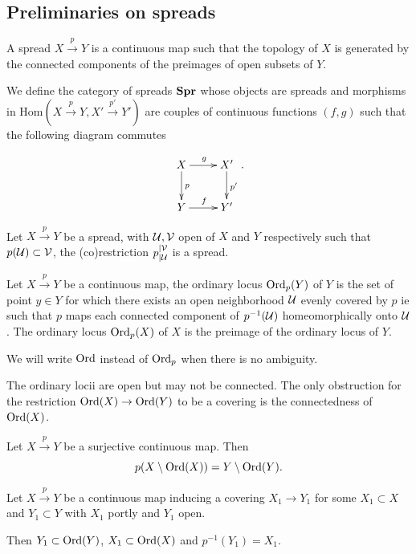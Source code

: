 \subsection{Preliminaries on spreads}\label{sec:spread_base}


\begin{defi} A spread $X\xrightarrow{p} Y$ is a continuous map such that the topology of $X$ is generated by the connected components of the preimages of open subsets of $Y$.

We define the category of spreads $\mathbf{Spr}$ whose objects are spreads and morphisms in $\mathrm{Hom}(X\xrightarrow{p} Y, X'\xrightarrow{p'} Y')$ are couples of continuous functions $(f,g)$  such that the following diagram commutes

$$\xymatrix{
X\ar[d]^p \ar[r]^g & X' \ar[d]^{p'} \\ Y \ar[r]^{f} & Y'
}.$$

\end{defi}

\begin{rem} Let $X\xrightarrow{p} Y$ be a spread, 
with $\mathcal{U},\mathcal V$ open of $X$  and $Y$ respectively such that $p(\mathcal{U})\subset \mathcal V$, the (co)restriction $p_{|\mathcal{U}}^{|\mathcal V}$ is a spread.
\end{rem}
\begin{defi}
  Let $X\xrightarrow{p} Y$ be a continuous map, the  ordinary locus $\mathrm{Ord}_p(Y)$ of $Y$  is the set of point $y\in Y$  for which there exists an open neighborhood $\mathcal{U}$ evenly covered by $p$ ie such that $p$ maps each connected component of $p^{-1}(\mathcal{U})$ homeomorphically onto $\mathcal{U}$. The ordinary locus $\mathrm{Ord}_p(X)$ of $X$ is the preimage of the ordinary locus of $Y$.
  
  We will write $\mathrm{Ord}$ instead of $\mathrm{Ord}_p$ when there is no ambiguity.
\end{defi}
\begin{rem}
 The ordinary locii are open but may not be connected. The only obstruction for the restriction $\mathrm{Ord}(X)\rightarrow \mathrm{Ord}(Y)$ to be a covering is the connectedness of $\mathrm{Ord}(X)$.
\end{rem}
\begin{rem}\label{rem:singular_on_singular}
 Let $X\xrightarrow{p}Y$ be a surjective continuous map. Then $$p(X\setminus \mathrm{Ord}(X))  = Y\setminus \mathrm{Ord}(Y).$$
\end{rem}


\begin{lem}\label{lem:spread_partial_covering} Let $X\xrightarrow{p} Y$ be a continuous map inducing a covering $X_1\rightarrow Y_1$ for some $X_1\subset X$ and $Y_1\subset Y$ with $X_1$ portly and $Y_1$ open. 
 
 Then $Y_1\subset \mathrm{Ord}(Y)$, $X_1 \subset \mathrm{Ord}(X)$ and $p^{-1}(Y_1)=X_1$. 
\end{lem}



